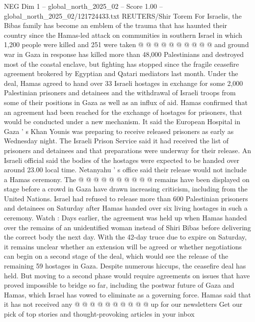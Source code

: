 \begin{textsample}{NEG Dim 1 – global\_north\_2025\_02 – Score 1.00 – global\_north\_2025\_02/121724433.txt}
REUTERS/Shir Torem For Israelis, the Bibas family has become an emblem of the trauma that has haunted their country since the Hamas-led attack on communities in southern Israel in which 1,200 people were killed and 251 were taken @ @ @ @ @ @ @ @ @ @ and ground war in Gaza in response has killed more than 48,000 Palestinians and destroyed most of the coastal enclave, but fighting has stopped since the fragile ceasefire agreement brokered by Egyptian and Qatari mediators last month.
Under the deal, Hamas agreed to hand over 33 Israeli hostages in exchange for some 2,000 Palestinian prisoners and detainees and the withdrawal of Israeli troops from some of their positions in Gaza as well as an influx of aid.
Hamas confirmed that an agreement had been reached for the exchange of hostages for prisoners, that would be conducted under a new mechanism.
It said the European Hospital in Gaza ' s Khan Younis was preparing to receive released prisoners as early as Wednesday night.
The Israeli Prison Service said it had received the list of prisoners and detainees and that preparations were underway for their release.
An Israeli official said the bodies of the hostages were expected to be handed over around 23.00 local time.
Netanyahu ' s office said their release would not include a Hamas ceremony.
The @ @ @ @ @ @ @ @ @ @ remains have been displayed on stage before a crowd in Gaza have drawn increasing criticism, including from the United Nations.
Israel had refused to release more than 600 Palestinian prisoners and detainees on Saturday after Hamas handed over six living hostages in such a ceremony.
Watch : Days earlier, the agreement was held up when Hamas handed over the remains of an unidentified woman instead of Shiri Bibas before delivering the correct body the next day.
With the 42-day truce due to expire on Saturday, it remains unclear whether an extension will be agreed or whether negotiations can begin on a second stage of the deal, which would see the release of the remaining 59 hostages in Gaza.
Despite numerous hiccups, the ceasefire deal has held.
But moving to a second phase would require agreements on issues that have proved impossible to bridge so far, including the postwar future of Gaza and Hamas, which Israel has vowed to eliminate as a governing force.
Hamas said that it has not received any @ @ @ @ @ @ @ @ @ @ up for our newsletters Get our pick of top stories and thought-provoking articles in your inbox

\end{textsample}
